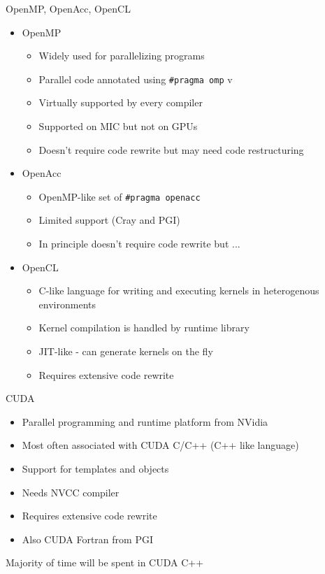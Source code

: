 \documentclass{beamer}
\begin{document}
\begin{frame}[fragile]{OpenMP, OpenAcc, OpenCL}
\begin{itemize}

\item OpenMP
  \begin{itemize}
  \item Widely used for parallelizing programs
  \item Parallel code annotated using {\tt \#pragma omp}
v  \item Virtually supported by every compiler
  \item Supported on MIC but not on GPUs
  \item Doesn't require code rewrite but may need code restructuring
  \end{itemize}

\item
  OpenAcc
  \begin{itemize}
  \item OpenMP-like set of {\tt \#pragma openacc}
  \item Limited support (Cray and PGI)
  \item In principle doesn't require code rewrite but ...
  \end{itemize}

\item
  OpenCL
  \begin{itemize}
  \item C-like language for writing and executing kernels in heterogenous environments
  \item Kernel compilation is handled by runtime library
  \item JIT-like - can generate kernels on the fly
  \item Requires extensive code rewrite
  \end{itemize}

\end{itemize}
\end{frame}

\begin{frame}[fragile]{CUDA}
  \begin{itemize}
  \item Parallel programming and runtime platform from NVidia
  \item Most often associated with CUDA C/C++ (C++ like language)
  \item Support for templates and objects
  \item Needs NVCC compiler
  \item Requires extensive code rewrite
  \item Also CUDA Fortran from PGI
  \end{itemize}
  Majority of time will be spent in CUDA C++
\end{frame}
\end{document}
